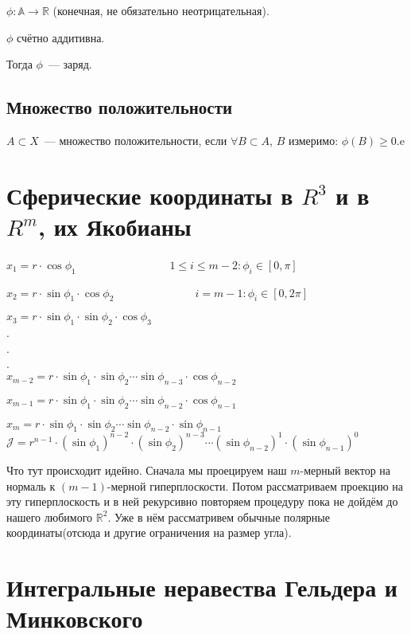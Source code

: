 \documentclass[paper=a4, fontsize=17pt]{article}
\begin{document}
	$\phi: \mathds{A} \to \mathds{R}$ (конечная, не обязательно неотрицательная).
	
	$\phi$ счётно аддитивна.
	
	Тогда $\phi$~--- заряд.
	
	\subsection{Множество положительности}
	$A \subset X$~--- множество положительности, если
	$\forall B \subset A$, $B$ измеримо: $\phi(B) \geq 0$.e
	
	\section{Сферические координаты в $ R^3 $ и в $ R^m $, их Якобианы}
	$x_1 = r \cdot \cos \phi_1$
	$\ \ \ \ \ \ \ \ \ \ \ \ \ \ \ \ \ \ \ \ \ \ \ \ \ \ \ \ \ \ \ \ \ \ \ $ 
	$1 \leq i \leq m-2: \phi_i \in [0,\pi]$
	
	$x_2 = r \cdot \sin \phi_1 \cdot \cos \phi_2$
	$\ \ \ \ \ \ \ \ \ \ \ \ \ \ \ \ \ \ \ \ \ \ \ \ \ \ \ \ \ \ $
	$i=m-1: \phi_i \in [0,2\pi]$
	
	$x_3 = r \cdot \sin \phi_1 \cdot \sin \phi_2 \cdot \cos \phi_3$\\
	.\\
	.\\
	.\\
	$x_{m-2} = r \cdot \sin \phi_1 \cdot \sin \phi_2 \cdots \sin \phi_{n-3} \cdot \cos \phi_{n-2}$
	
	$x_{m-1} = r \cdot \sin \phi_1 \cdot \sin \phi_2 \cdots \sin \phi_{n-2} \cdot \cos \phi_{n-1}$
	
	
	$x_{m} = r \cdot \sin \phi_1 \cdot \sin \phi_2 \cdots \sin \phi_{n-2} \cdot \sin \phi_{n-1}$\\
	
	$\mathcal{J} = r^{n-1} \cdot (\sin \phi_1)^{n-2} \cdot (\sin \phi_2)^{n-3} \cdots (\sin \phi_{n-2})^{1} \cdot (\sin \phi_{n-1})^{0}$
	
	Что тут происходит идейно. Сначала мы проецируем наш $m$-мерный вектор на нормаль к $(m-1)$-мерной гиперплоскости. Потом рассматриваем проекцию на эту гиперплоскость и в ней рекурсивно повторяем процедуру пока не дойдём до нашего любимого $\mathbb{R}^2$. Уже в нём рассматривем обычные полярные координаты(отсюда и другие ограничения на размер угла).
	
	\section{Интегральные неравества Гельдера и Минковского}
\end{document}
